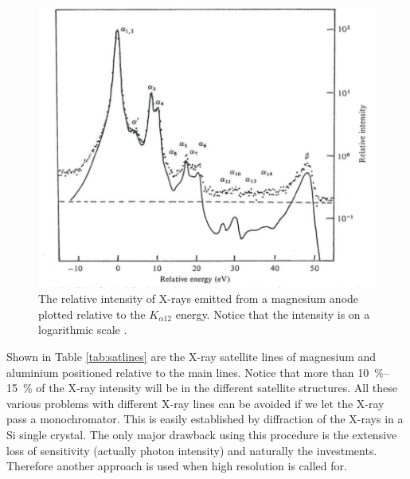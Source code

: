 \begin{figure}[h!]
	\begin{center}
	\includegraphics[scale=4.5]{figures/04_06.png}
	\caption{The relative intensity of X-rays emitted from a magnesium anode plotted relative to the $K_{\alpha 12}$ energy. Notice that the intensity is on a logarithmic scale \cite{krause}.}
	\label{fig:mganode}
	\end{center}
\end{figure}

Shown in Table \ref{tab:satlines} are the X-ray satellite lines of magnesium and aluminium positioned relative to the main lines. Notice that more than \SIrange{10}{15}{\percent} of the X-ray intensity will be in the different satellite structures. All these various problems with different X-ray lines can be avoided if we let the X-ray pass a monochromator. This is easily established by diffraction of the X-rays in a Si single crystal. The only major drawback using this procedure is the extensive loss of sensitivity (actually photon intensity) and naturally the investments. Therefore another approach is used when high resolution is called for.

